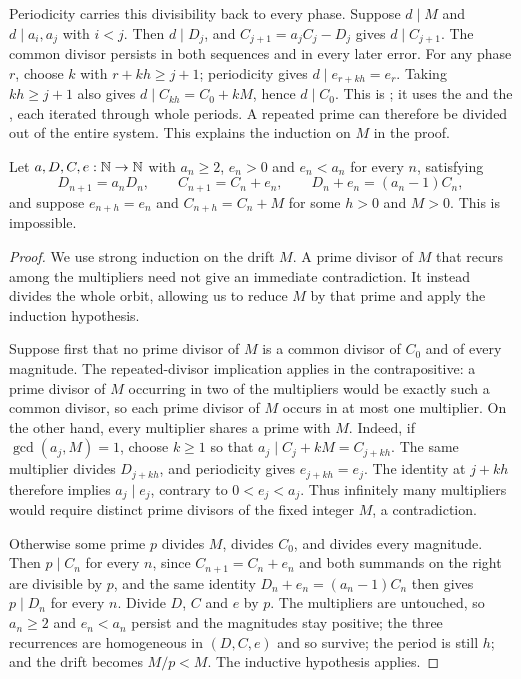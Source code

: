 \documentclass[11pt]{article}
\begin{document}
Periodicity carries this divisibility back to every phase. Suppose
$d\mid M$ and $d\mid a_i,a_j$ with $i<j$. Then $d\mid D_j$, and
$C_{j+1}=a_jC_j-D_j$ gives $d\mid C_{j+1}$. The common divisor
persists in both sequences and in every later error. For any phase $r$,
choose $k$ with $r+kh\ge j+1$; periodicity gives
$d\mid e_{r+kh}=e_r$. Taking $kh\ge j+1$ also gives
$d\mid C_{kh}=C_0+kM$, hence $d\mid C_0$. This is
; it uses the
and the
, each iterated through whole periods.
A repeated prime can therefore be divided out of the entire system.
This explains the induction on $M$ in the proof.

\begin{theorem}\label{long243:res:periodic}
Let $a,D,C,e:\mathbb{N}\to\mathbb{N}$ with $a_n\ge2$, $e_n>0$ and $e_n<a_n$ for every $n$,
satisfying
\[
 D_{n+1}=a_nD_n,\qquad C_{n+1}=C_n+e_n,\qquad D_n+e_n=(a_n-1)C_n ,
\]
and suppose $e_{n+h}=e_n$ and $C_{n+h}=C_n+M$ for some $h>0$ and $M>0$.  This
is impossible.
\end{theorem}

\begin{proof}
We use strong induction on the drift $M$. A prime divisor of $M$ that
recurs among the multipliers need not give an immediate contradiction.
It instead divides the whole orbit, allowing us to reduce $M$ by that
prime and apply the induction hypothesis.

Suppose first that no prime divisor of $M$ is a common divisor of $C_0$ and of
every magnitude.  The repeated-divisor implication applies in the
contrapositive: a prime divisor of $M$ occurring in two of the multipliers
would be exactly such a common divisor, so each prime divisor of $M$ occurs in
at most one multiplier.  On the other hand, every multiplier shares a prime with $M$.
Indeed, if $\gcd(a_j,M)=1$, choose $k\ge1$ so that
$a_j\mid C_j+kM=C_{j+kh}$. The same multiplier divides $D_{j+kh}$,
and periodicity gives $e_{j+kh}=e_j$. The identity at $j+kh$
therefore implies $a_j\mid e_j$, contrary to $0<e_j<a_j$.
Thus infinitely many multipliers would require distinct prime divisors
of the fixed integer $M$, a contradiction.

Otherwise some prime $p$ divides $M$, divides $C_0$, and divides every
magnitude.  Then $p\mid C_n$ for every $n$, since $C_{n+1}=C_n+e_n$ and both
summands on the right are divisible by $p$, and the same identity
$D_n+e_n=(a_n-1)C_n$ then gives $p\mid D_n$ for every $n$.  Divide $D$, $C$ and
$e$ by $p$.  The multipliers are untouched, so $a_n\ge2$ and $e_n<a_n$ persist
and the magnitudes stay positive; the three recurrences are homogeneous in
$(D,C,e)$ and so survive; the period is still $h$; and the drift becomes
$M/p<M$.  The inductive hypothesis applies.
\end{proof}
\end{document}
